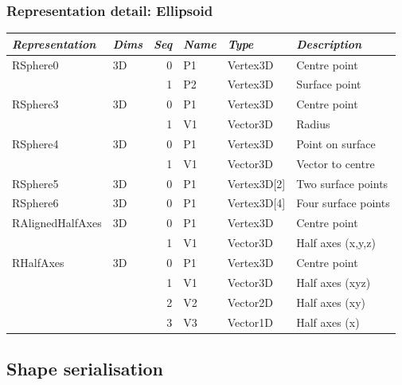 \documentclass{beamer}
\begin{document}
\begin{frame}[fragile]
  \frametitle{Representation detail: Ellipsoid}
\scriptsize
\begin{tabular}{llrlll}
\textit{Representation} &  \textit{Dims} & \textit{Seq} & \textit{Name}  & \textit{Type}         & \textit{Description} \\
\toprule
RSphere0          & 3D   & 0   & P1  & Vertex3D     & Centre point \\
                  &      & 1   & P2  & Vertex3D     & Surface point \\
\cmidrule{3-6}
RSphere3          & 3D   & 0   & P1  & Vertex3D     & Centre point \\
                  &      & 1   & V1  & Vector3D     & Radius \\
\cmidrule{3-6}
RSphere4          & 3D   & 0   & P1  & Vertex3D     & Point on surface \\
                  &      & 1   & V1  & Vector3D     & Vector to centre \\
\cmidrule{3-6}
RSphere5          & 3D   & 0   & P1  & Vertex3D[2]  & Two surface points \\
\cmidrule{3-6}
RSphere6          & 3D   & 0   & P1  & Vertex3D[4]  & Four surface points \\
\cmidrule{3-6}
RAlignedHalfAxes  & 3D   & 0   & P1  & Vertex3D     & Centre point \\
                  &      & 1   & V1  & Vector3D     & Half axes (x,y,z) \\
\cmidrule{3-6}
RHalfAxes         & 3D   & 0   & P1  & Vertex3D     & Centre point \\
                  &      & 1   & V1  & Vector3D     & Half axes (xyz) \\
                  &      & 2   & V2  & Vector2D     & Half axes (xy) \\
                  &      & 3   & V3  & Vector1D     & Half axes (x) \\
\end{tabular}
\end{frame}

\subsection{Shape serialisation}
\end{document}
